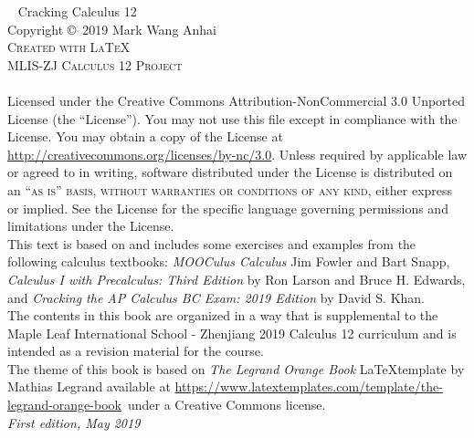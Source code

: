 \newpage
~\vfill
\thispagestyle{empty}
\noindent Cracking Calculus 12\\
\noindent Copyright \copyright\ 2019 Mark Wang Anhai\\ %
\noindent \textsc{Created with \LaTeX}\\ %
\noindent \textsc{MLIS-ZJ Calculus 12 Project}\\\\
\noindent 
    Licensed under the Creative Commons Attribution-NonCommercial 3.0 
    Unported License (the ``License''). You may not use this file except in 
    compliance with the License. You may obtain a copy of the License at 
    \url{http://creativecommons.org/licenses/by-nc/3.0}. Unless required by 
    applicable law or agreed to in writing, software distributed under the 
    License is distributed on an \textsc{``as is'' basis, without warranties 
    or conditions of any kind}, either express or implied. See the License 
    for the specific language governing permissions and limitations under 
    the License.\\ %

\noindent
    This text is based on and includes some exercises and examples from the following calculus textbooks: \textit{MOOCulus Calculus} Jim Fowler and Bart Snapp, \textit{Calculus I with Precalculus: Third Edition} by Ron Larson and Bruce H. Edwards, and \textit{Cracking the AP Calculus BC Exam: 2019 Edition} by David S. Khan. \\

\noindent
    The contents in this book are organized in a way that is supplemental to the Maple Leaf International School - Zhenjiang 2019 Calculus 12 curriculum and is intended as a revision material for the course. \\

\noindent
    The theme of this book is based on \textit{The Legrand Orange Book} \LaTeX \text{ }template by Mathias Legrand available at \url{https://www.latextemplates.com/template/the-legrand-orange-book}~under a Creative Commons license. \\

\noindent \textit{First edition, May 2019} %
